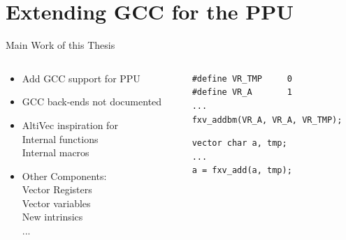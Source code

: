 \documentclass[10pt,aspectratio=169]{beamer}
\begin{document}
\section{Extending GCC for the PPU}
\begin{frame}[fragile]{Main Work of this Thesis}
    \begin{columns}[c]
    \begin{column}{0.5\textwidth}
		\begin{itemize}[<+->]
			\setlength\itemsep{1em}
            \item Add GCC support for PPU
			\item GCC back-ends not documented
			\item AltiVec inspiration for\\\hspace{2em}
				Internal functions\\\hspace{2em}
				Internal macros
			\item Other Components:\\\hspace{2em}
				Vector Registers\\\hspace{2em}
				Vector variables\\\hspace{2em}
				New intrinsics\\\hspace{2em}
					...
        \end{itemize}
    \end{column}

    \begin{column}{0.5\textwidth}
				\begin{lstlisting}[title=Previous PPU code]
#define VR_TMP     0
#define VR_A       1
...
fxv_addbm(VR_A, VR_A, VR_TMP);
				\end{lstlisting}
				\hspace*{3em}
				\begin{lstlisting}[title=New PPU code]
vector char a, tmp;
...
a = fxv_add(a, tmp);
				\end{lstlisting}
			
    \end{column}
    \end{columns}
\end{frame}
\end{document}
